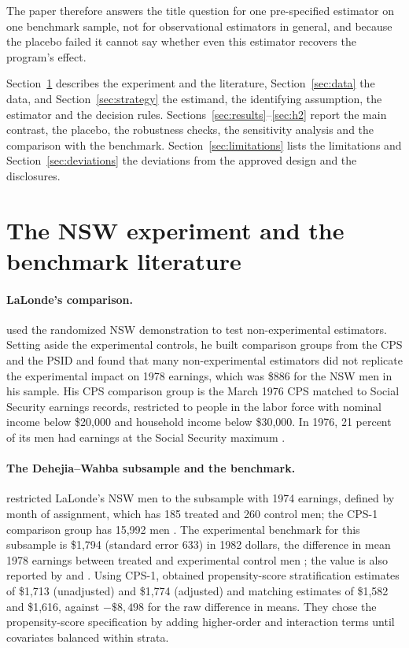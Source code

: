 \documentclass[11pt]{article}
\begin{document}
The paper therefore answers the title question for one pre-specified estimator on one
benchmark sample, not for observational estimators in general, and because the placebo
failed it cannot say whether even this estimator recovers the program's effect.

Section~\ref{sec:background} describes the experiment and the literature,
Section~\ref{sec:data} the data, and Section~\ref{sec:strategy} the estimand, the
identifying assumption, the estimator and the decision rules.
Sections~\ref{sec:results}--\ref{sec:h2} report the main contrast, the placebo, the
robustness checks, the sensitivity analysis and the comparison with the benchmark.
Section~\ref{sec:limitations} lists the limitations and Section~\ref{sec:deviations} the
deviations from the approved design and the disclosures.

\section{The NSW experiment and the benchmark literature}
\label{sec:background}

\paragraph{LaLonde's comparison.} \citet{lalonde1986} used the randomized NSW
demonstration to test non-experimental estimators. Setting aside the experimental controls,
he built comparison groups from the CPS and the PSID and found that many non-experimental
estimators did not replicate the experimental impact on 1978 earnings, which was \$886 for
the NSW men in his sample. His CPS comparison group is the March 1976 CPS matched to Social
Security earnings records, restricted to people in the labor force with nominal income below
\$20,000 and household income below \$30,000. In 1976, 21 percent of its men had earnings at
the Social Security maximum \citep[pp.~611--612]{lalonde1986}.

\paragraph{The Dehejia--Wahba subsample and the benchmark.} \citet{dehejia1999} restricted
LaLonde's NSW men to the subsample with 1974 earnings, defined by month of assignment,
which has 185 treated and 260 control men; the CPS-1 comparison group has 15,992 men
\citep{dehejia1999,dehejiadata}. The experimental benchmark for this subsample is
\$1,794 (standard error 633) in 1982 dollars, the difference in mean 1978 earnings between
treated and experimental control men \citep[Tables~2--3]{dehejia1999}; the value is also
reported by \citet{smith2005} and \citet{imbens2025}. Using CPS-1, \citet[Table~3]{dehejia1999}
obtained propensity-score stratification estimates of \$1,713 (unadjusted) and \$1,774
(adjusted) and matching estimates of \$1,582 and \$1,616, against $-\$8{,}498$ for the raw
difference in means. They chose the propensity-score specification by adding higher-order
and interaction terms until covariates balanced within strata.
\end{document}
